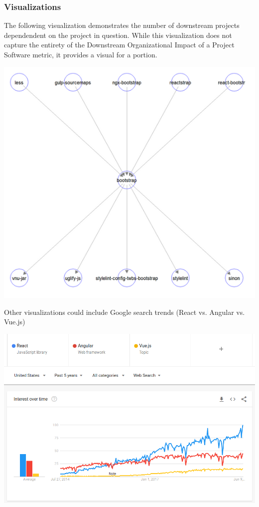 \hypertarget{visualizations}{%
\subsubsection{Visualizations}\label{visualizations}}

The following visualization demonstrates the number of downstream
projects dependendent on the project in question. While this
visualization does not capture the entirety of the Downstream
Organizational Impact of a Project Software metric, it provides a visual
for a portion.

\includegraphics{images/organizational-project-skill-demand_paper.png}

Other visualizations could include Google search trends (React vs.
Angular vs. Vue.js)

\includegraphics{images/organizational-project-skill-demand_google-trends.png}

